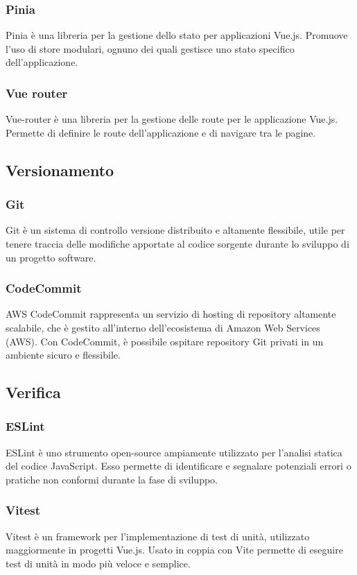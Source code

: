  \subsubsection{Pinia}\label{subsubsec:pinia}
Pinia è una libreria per la gestione dello stato per applicazioni Vue.js. Promuove l'uso di store modulari, ognuno dei quali gestisce uno stato specifico dell'applicazione.
\subsubsection{Vue router}\label{subsubsec:vue-router}
Vue-router è una libreria per la gestione delle route per le applicazione Vue.js. Permette di definire le route dell'applicazione e di navigare tra le pagine.

\subsection{Versionamento}\label{subsec:versionamento}
\subsubsection{Git}\label{subsubsec:git}
Git è un sistema di controllo versione distribuito e altamente flessibile, utile per tenere traccia delle modifiche apportate al codice sorgente durante lo sviluppo di un progetto software.
\subsubsection{CodeCommit}\label{subsubsec:CodeCommit}
AWS CodeCommit rappresenta un servizio di hosting di repository altamente scalabile, che è gestito all'interno dell'ecosistema di Amazon Web Services (AWS). 
Con CodeCommit, è possibile ospitare repository Git privati in un ambiente sicuro e flessibile.

\subsection{Verifica}\label{subsec:verifica}
\subsubsection{ESLint}\label{subsubsec:eslint}
ESLint è uno strumento open-source ampiamente utilizzato per l'analisi statica del codice JavaScript. Esso permette di identificare e segnalare potenziali errori o pratiche non conformi durante la fase di sviluppo.
\subsubsection{Vitest}\label{subsubsec:vitest}
Vitest è un framework per l'implementazione di test di unità, utilizzato maggiormente in progetti Vue.js.
Usato in coppia con Vite permette di eseguire test di unità in modo più veloce e semplice.

